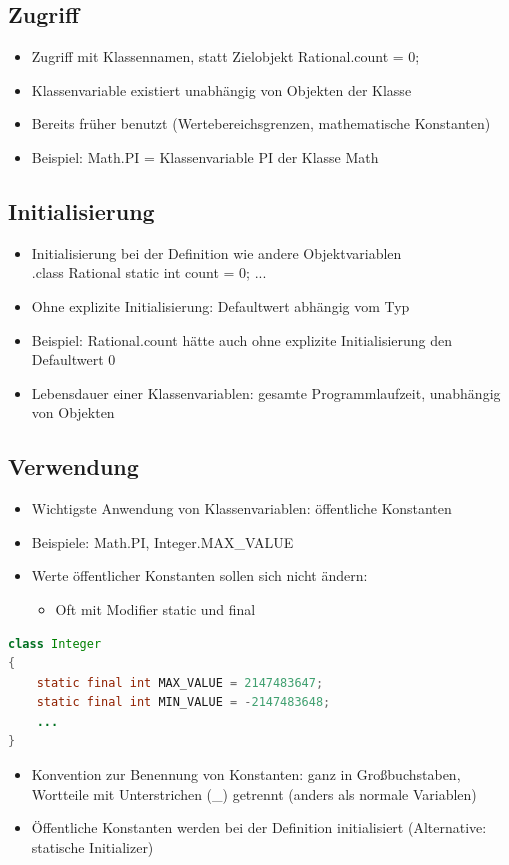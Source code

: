 \subsection{Zugriff}
\begin{itemize}
\item Zugriff mit Klassennamen, statt Zielobjekt Rational.count = 0;
\item Klassenvariable existiert unabhängig von Objekten der Klasse
\item Bereits früher benutzt (Wertebereichsgrenzen, mathematische Konstanten)
\item Beispiel: Math.PI = Klassenvariable PI der Klasse Math
\end{itemize}

\subsection{Initialisierung}
\begin{itemize}
\item Initialisierung bei der Definition wie andere Objektvariablen\\
.\qquad class Rational { static int count = 0; ... }
\item Ohne explizite Initialisierung: Defaultwert abhängig vom Typ
\item Beispiel: Rational.count hätte auch ohne explizite Initialisierung den Defaultwert 0
\item Lebensdauer einer Klassenvariablen: gesamte Programmlaufzeit, unabhängig von Objekten
\end{itemize}

\subsection{Verwendung}
\begin{itemize}
\item Wichtigste Anwendung von Klassenvariablen: öffentliche Konstanten
\item Beispiele: Math.PI, Integer.MAX\_VALUE
\item Werte öffentlicher Konstanten sollen sich nicht ändern:
\begin{itemize}
\item Oft mit Modifier static und final
\end{itemize}
\end{itemize}
\begin{lstlisting}[language=JAVA]
class Integer
{
	static final int MAX_VALUE = 2147483647;
	static final int MIN_VALUE = -2147483648;
	...
}
\end{lstlisting}
\begin{itemize}
\item Konvention zur Benennung von Konstanten: ganz in Großbuchstaben, Wortteile mit Unterstrichen (\_) getrennt (anders als normale Variablen)
\item Öffentliche Konstanten werden bei der Definition initialisiert (Alternative: statische Initializer)
\end{itemize}
%
%
%
